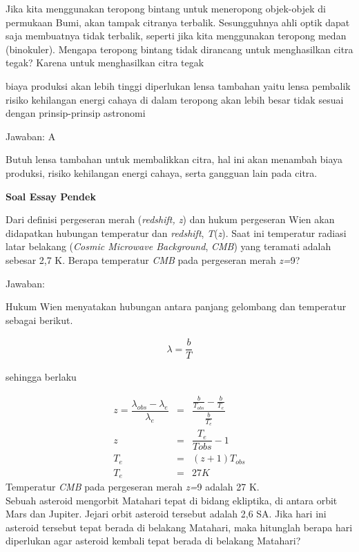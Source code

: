 \documentclass[11pt,fleqn]{exam}
\begin{document}
\begin{questions}
{\question Jika kita menggunakan teropong bintang untuk meneropong objek-objek di permukaan Bumi, akan tampak citranya terbalik. Sesungguhnya ahli optik dapat saja membuatnya tidak terbalik, seperti jika kita menggunakan teropong medan (binokuler). Mengapa teropong bintang tidak dirancang untuk menghasilkan citra tegak? Karena untuk menghasilkan citra tegak 
\begin{choices}
\choice biaya produksi akan lebih tinggi
\choice diperlukan lensa tambahan yaitu lensa pembalik
\choice risiko kehilangan energi cahaya di dalam teropong akan lebih besar
\choice tidak sesuai dengan prinsip-prinsip astronomi
\end{choices}

Jawaban: A

Butuh lensa tambahan untuk membalikkan citra, hal ini akan menambah biaya produksi, risiko kehilangan energi cahaya, serta gangguan lain pada citra. \\
}%


\newpage
\textbf{Soal Essay Pendek}

\question Dari definisi pergeseran merah (\textit{redshift, z}) dan hukum pergeseran Wien akan didapatkan hubungan temperatur dan \textit{redshift}, \textit{T}(\textit{z}). Saat ini temperatur radiasi latar belakang (\textit{Cosmic Microwave Background}, \textit{CMB}) yang teramati adalah sebesar 2,7 K. Berapa temperatur \textit{CMB} pada pergeseran merah \textit{z=}9?

Jawaban:

Hukum Wien menyatakan hubungan antara panjang gelombang dan temperatur sebagai berikut.

\begin{eqnarray*}
\lambda=\dfrac{b}{T}
\end{eqnarray*}

sehingga berlaku

\begin{eqnarray*}
z=\dfrac{\lambda_{obs}-\lambda_e}{\lambda_e}&=&\dfrac{\frac{b}{T_{obs}}-\frac{b}{T_e}}{\frac{b}{T_e}}\\
z&=&\dfrac{T_e}{T{obs}}-1\\
T_e&=&(z+1)T_{obs}\\
T_e&=&27 K
\end{eqnarray*}
Temperatur \textit{CMB} pada pergeseran merah \textit{z=}9 adalah 27 K.\\


\question Sebuah asteroid mengorbit Matahari tepat di bidang ekliptika, di antara orbit Mars dan Jupiter. Jejari orbit asteroid tersebut adalah 2,6 SA. Jika hari ini asteroid tersebut tepat berada di belakang Matahari, maka hitunglah berapa hari diperlukan agar asteroid kembali tepat berada di belakang Matahari?


\end{questions}
\end{document}
